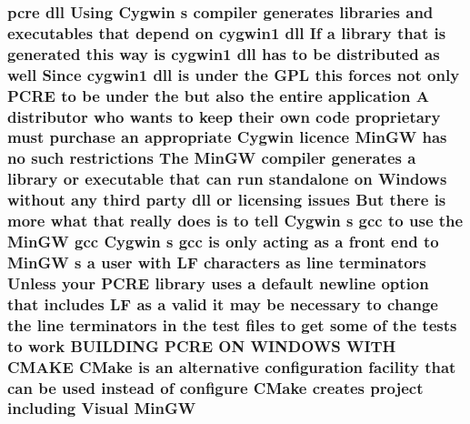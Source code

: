 \subsubsection[{\texorpdfstring{Min\+GW}{MinGW}}]{ {\bf pcre} dll Using Cygwin {\bf s} {\bf compiler} generates {\bf libraries} and executables that depend {\bf on} cygwin1 dll If {\bf a} {\bf library} that {\bf is} {\bf generated} {\bf this} {\bf way} {\bf is} cygwin1 dll has {\bf to} {\bf be} {\bf distributed} {\bf as} well Since cygwin1 dll {\bf is} under the {\bf G\+PL} {\bf this} forces {\bf not} only {\bf P\+C\+RE} {\bf to} {\bf be} under the but also the entire application {\bf A} distributor who wants {\bf to} keep their own {\bf code} proprietary must purchase an appropriate Cygwin {\bf licence} Min\+GW has no such restrictions The Min\+GW {\bf compiler} generates {\bf a} {\bf library} {\bf or} executable that {\bf can} {\bf run} standalone {\bf on} {\bf Windows} without {\bf any} third party dll {\bf or} licensing issues But there {\bf is} more {\bf what} that really does {\bf is} {\bf to} tell Cygwin {\bf s} {\bf gcc} {\bf to} use the Min\+GW {\bf gcc} Cygwin {\bf s} {\bf gcc} {\bf is} only acting {\bf as} {\bf a} front {\bf end} {\bf to} Min\+GW {\bf s} {\bf a} user {\bf with} {\bf LF} {\bf characters} {\bf as} {\bf line} terminators Unless your {\bf P\+C\+RE} {\bf library} uses {\bf a} {\bf default} {\bf newline} {\bf option} that includes {\bf LF} {\bf as} {\bf a} valid {\bf it} may {\bf be} necessary {\bf to} change the {\bf line} terminators {\bf in} the test {\bf files} {\bf to} get some {\bf of} the {\bf tests} {\bf to} work B\+U\+I\+L\+D\+I\+NG {\bf P\+C\+RE} ON W\+I\+N\+D\+O\+WS W\+I\+TH C\+M\+A\+KE C\+Make {\bf is} an alternative configuration {\bf facility} that {\bf can} {\bf be} {\bf used} instead {\bf of} {\bf configure} C\+Make creates {\bf project} including Visual Min\+GW}\hypertarget{NON-AUTOTOOLS-BUILD_8txt_a4e159d4b70e34e8129c1780b41a4c3de}{}\label{NON-AUTOTOOLS-BUILD_8txt_a4e159d4b70e34e8129c1780b41a4c3de}
